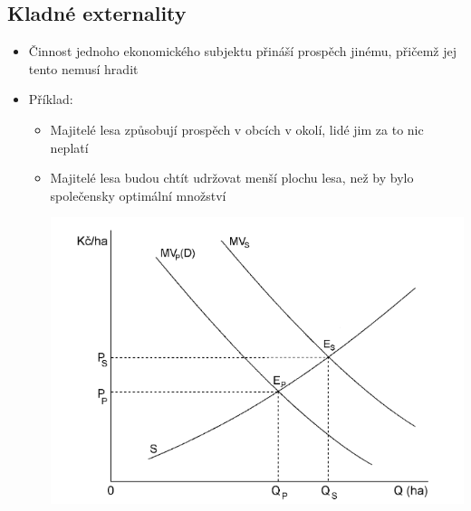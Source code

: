 \subsection{Kladné externality}
\begin{itemize}
    \item Činnost jednoho ekonomického subjektu přináší prospěch jinému, přičemž jej tento nemusí hradit
    \item Příklad:
    \begin{itemize}
        \item Majitelé lesa způsobují prospěch v obcích v okolí, lidé jim za to nic neplatí
        \item Majitelé lesa budou chtít udržovat menší plochu lesa, než by bylo společensky optimální množství
        
        \includegraphics[width=15cm]{images/22_kladne.png}
    \end{itemize}
\end{itemize}

